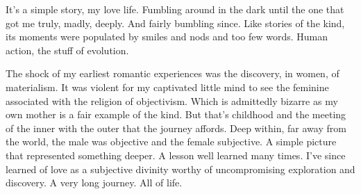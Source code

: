 

It's a simple story, my love life.  Fumbling around in the dark until
the one that got me truly, madly, deeply.  And fairly bumbling since.
Like stories of the kind, its moments were populated by smiles and
nods and too few words.  Human action, the stuff of evolution.

The shock of my earliest romantic experiences was the discovery, in
women, of materialism.  It was violent for my captivated little mind
to see the feminine associated with the religion of objectivism.
Which is admittedly bizarre as my own mother is a fair example of the
kind.  But that's childhood and the meeting of the inner with the
outer that the journey affords.  Deep within, far away from the world,
the male was objective and the female subjective.  A simple picture
that represented something deeper.  A lesson well learned many times.
I've since learned of love as a subjective divinity worthy of
uncompromising exploration and discovery.  A very long journey.  All
of life.

\bye
